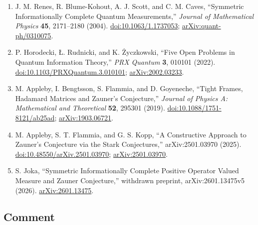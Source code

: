 \begin{enumerate}[label={},leftmargin=4.8em,labelsep=0.5em]
  \footnotesize
  \item[\textup{[RBS+04]}]\label{ref:p17-renes-et-al}
  J. M. Renes, R. Blume-Kohout, A. J. Scott, and C. M. Caves,
  ``Symmetric Informationally Complete Quantum Measurements,''
  \emph{Journal of Mathematical Physics} \textbf{45}, 2171--2180 (2004).
  \href{https://doi.org/10.1063/1.1737053}%
       {doi:10.1063/1.1737053};
  \href{https://arxiv.org/abs/quant-ph/0310075}%
       {arXiv:quant-ph/0310075}.

  \item[\textup{[HRZ22]}]\label{ref:p17-horodecki-et-al}
  P. Horodecki, \L. Rudnicki, and K. \.{Z}yczkowski,
  ``Five Open Problems in Quantum Information Theory,''
  \emph{PRX Quantum} \textbf{3}, 010101 (2022).
  \href{https://doi.org/10.1103/PRXQuantum.3.010101}%
       {doi:10.1103/PRXQuantum.3.010101};
  \href{https://arxiv.org/abs/2002.03233}{arXiv:2002.03233}.

  \item[\textup{[ABFG19]}]\label{ref:p17-appleby-et-al}
  M. Appleby, I. Bengtsson, S. Flammia, and D. Goyeneche,
  ``Tight Frames, Hadamard Matrices and Zauner's Conjecture,''
  \emph{Journal of Physics A: Mathematical and Theoretical} \textbf{52},
  295301 (2019).
  \href{https://doi.org/10.1088/1751-8121/ab25ad}%
       {doi:10.1088/1751-8121/ab25ad};
  \href{https://arxiv.org/abs/1903.06721}{arXiv:1903.06721}.

  \item[\textup{[AFK25]}]\label{ref:p17-appleby-flammia-kopp}
  M. Appleby, S. T. Flammia, and G. S. Kopp,
  ``A Constructive Approach to Zauner's Conjecture via the Stark
  Conjectures,'' arXiv:2501.03970 (2025).
  \href{https://doi.org/10.48550/arXiv.2501.03970}%
       {doi:10.48550/arXiv.2501.03970};
  \href{https://arxiv.org/abs/2501.03970}{arXiv:2501.03970}.

  \item[\textup{[Jok26]}]\label{ref:p17-joka}
  S. Joka,
  ``Symmetric Informationally Complete Positive Operator Valued Measure and
  Zauner Conjecture,'' withdrawn preprint, arXiv:2601.13475v5 (2026).
  \href{https://arxiv.org/abs/2601.13475}{arXiv:2601.13475}.
\end{enumerate}

\subsection*{Comment}

